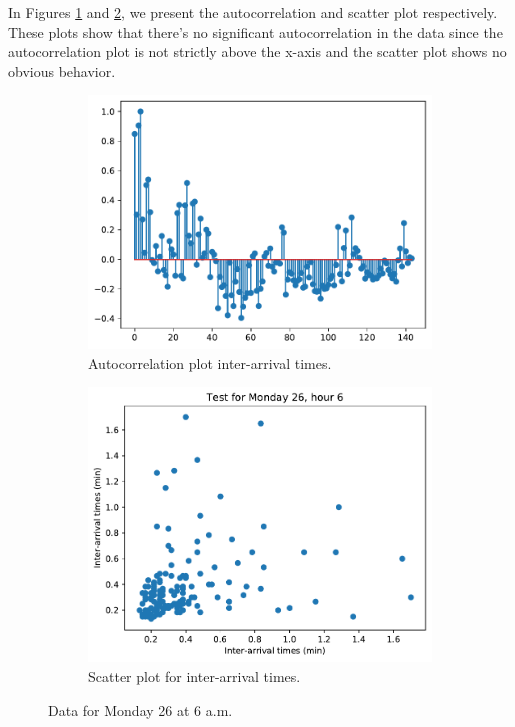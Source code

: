 In Figures \ref{subfig:acorr} and \ref{subfig:scatter_autocorr}, we present the autocorrelation and scatter plot respectively. These plots show that there's no significant autocorrelation in the data since the autocorrelation plot is not strictly above the x-axis and the scatter plot shows no obvious behavior.

\begin{figure}[H]
        \centering
        \begin{subfigure}[t]{0.475\textwidth}
            \centering
            \includegraphics[scale=0.5]{files/test-for-monday-26-hour-6-acorr.pdf}
            \caption{Autocorrelation plot inter-arrival times.}
            \label{subfig:acorr}
        \end{subfigure}
        \begin{subfigure}[t]{0.475\textwidth}   
            \centering
            \includegraphics[scale=0.5]{files/test-for-monday-26-hour-6.pdf}
            \caption{Scatter plot for inter-arrival times.}
            \label{subfig:scatter_autocorr}
        \end{subfigure}
        \caption{Data for Monday 26 at 6 a.m.}
        \label{fig:autocorr}
	\end{figure}



